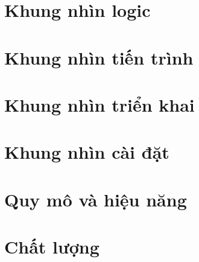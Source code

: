 \documentclass[11pt, a4paper]{article}
\begin{document}
	
	\section{Khung nhìn logic}
	
	
	\section{Khung nhìn tiến trình}
	
	
	\section{Khung nhìn triển khai}
	
	
	\section{Khung nhìn cài đặt }
	
	
	\section{Quy mô và hiệu năng}
	
	
	\section{Chất lượng}
	
	
	\clearpage
	\glsaddall
	\printglossary[title={Giải thích thuật ngữ}]

	
\end{document}
